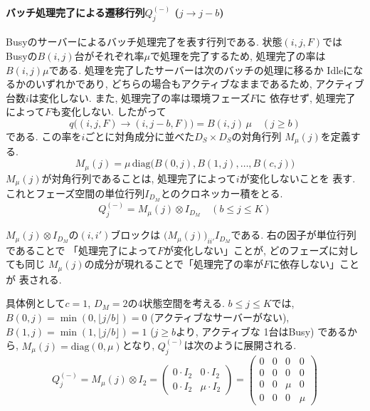 \documentclass[a4paper, 11pt, dvipdfmx]{jsreport}
\begin{document}
\paragraph{バッチ処理完了による遷移行列$Q^{(-)}_j$ ($j \to j-b$)}
\label{sec:q-minus}

Busyのサーバーによるバッチ処理完了を表す行列である. 状態$(i, j, F)$では
Busyの$B(i, j)$台がそれぞれ率$\mu$で処理を完了するため, 処理完了の率は
$B(i, j)\mu$である. 処理を完了したサーバーは次のバッチの処理に移るか
Idleになるかのいずれかであり, どちらの場合もアクティブなままであるため, 
アクティブ台数$i$は変化しない. また, 処理完了の率は環境フェーズ$F$に
依存せず, 処理完了によって$F$も変化しない. したがって
\[
    q\big((i, j, F) \to (i, j-b, F)\big) = B(i, j)\, \mu \quad (j \ge b)
\]
である. この率を$i$ごとに対角成分に並べた$D_S \times D_S$の対角行列
$M_\mu(j)$を定義する. 
\begin{equation}
    M_\mu(j) = \mu\, \mathrm{diag}\big(B(0, j), B(1, j), \dots, B(c, j)\big)
\end{equation}
$M_\mu(j)$が対角行列であることは, 処理完了によって$i$が変化しないことを
表す. これとフェーズ空間の単位行列$I_{D_M}$とのクロネッカー積をとる. 
\begin{equation}
    Q^{(-)}_{j} = M_\mu(j) \otimes I_{D_M} \quad (b \le j \le K)
\end{equation}

$M_\mu(j) \otimes I_{D_M}$の$(i, i')$ブロックは
$\big(M_\mu(j)\big)_{i i'} I_{D_M}$である. 右の因子が単位行列であることで
「処理完了によって$F$が変化しない」ことが, どのフェーズに対しても同じ
$M_\mu(j)$の成分が現れることで「処理完了の率が$F$に依存しない」ことが
表される. 

具体例として$c=1$, $D_M=2$の4状態空間を考える. $b \le j \le K$では, 
$B(0, j) = \min(0, \lfloor j/b \rfloor) = 0$ (アクティブなサーバーがない), 
$B(1, j) = \min(1, \lfloor j/b \rfloor) = 1$ ($j \ge b$より, アクティブな
1台はBusy) であるから, $M_\mu(j) = \mathrm{diag}(0, \mu)$となり, 
$Q_j^{(-)}$は次のように展開される. 
\begin{equation}
Q_j^{(-)} = M_{\mu}(j) \otimes I_2 =
\begin{pmatrix}
0 \cdot I_2 & 0 \cdot I_2 \\
0 \cdot I_2 & \mu \cdot I_2
\end{pmatrix}
=
\begin{pmatrix}
0 & 0 & 0 & 0 \\
0 & 0 & 0 & 0 \\
0 & 0 & \mu & 0 \\
0 & 0 & 0 & \mu
\end{pmatrix}
\label{eq:kronecker_example_q_minus}
\end{equation}
\end{document}
